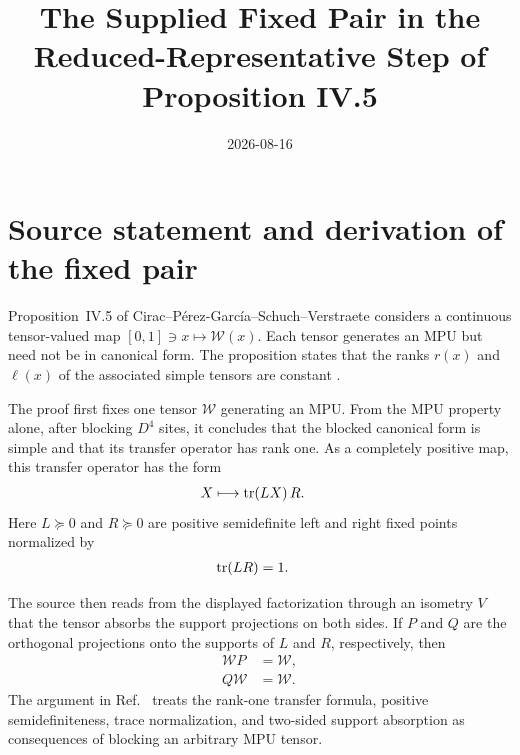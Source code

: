 \documentclass{article}
\title{The Supplied Fixed Pair in the Reduced-Representative Step of Proposition IV.5}
\author{}
\date{2026-08-16}
\begin{document}
\maketitle
{}

\section{Source statement and derivation of the fixed pair}

Proposition~IV.5 of Cirac--P\'erez-Garc\'ia--Schuch--Verstraete considers a
continuous tensor-valued map
$[0,1]\ni x\mapsto\mathcal W(x)$. Each tensor generates an MPU but need not be
in canonical form. The proposition states that the ranks $r(x)$ and $\ell(x)$
of the associated simple tensors are constant
\cite[Proposition~IV.5]{Cirac2017MPU}.

The proof first fixes one tensor $\mathcal W$ generating an MPU. From the MPU
property alone, after blocking $D^4$ sites, it concludes that the blocked
canonical form is simple and that its transfer operator has rank one. As a
completely positive map, this transfer operator has the form
\begin{align}
    X &\longmapsto \operatorname{tr}(LX)\,R.
    \label{eq:mpu_reduced_representative_supplied_fixed_pair_rank_one_transfer}
\end{align}
Here $L\succeq0$ and $R\succeq0$ are positive semidefinite left and right fixed
points normalized by
\begin{align}
    \operatorname{tr}(LR) &= 1.
    \label{eq:mpu_reduced_representative_supplied_fixed_pair_trace_normalization}
\end{align}

The source then reads from the displayed factorization through an isometry
$V$ that the tensor absorbs the support projections on both sides. If $P$ and
$Q$ are the orthogonal projections onto the supports of $L$ and $R$,
respectively, then
\begin{align}
    \mathcal WP
        &=\mathcal W,
    \label{eq:mpu_reduced_representative_supplied_fixed_pair_right_absorption}\\
    Q\mathcal W
        &=\mathcal W.
    \label{eq:mpu_reduced_representative_supplied_fixed_pair_left_absorption}
\end{align}
The argument in Ref.~\cite{Cirac2017MPU} treats the rank-one transfer formula,
positive semidefiniteness, trace normalization, and two-sided support
absorption as consequences of blocking an arbitrary MPU tensor.
\end{document}
